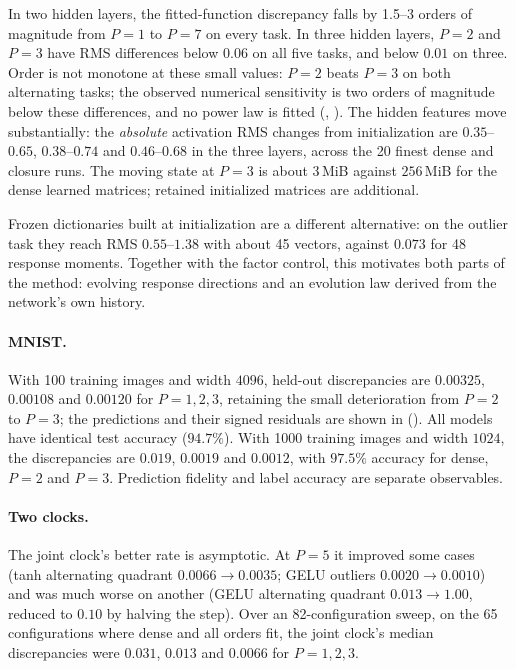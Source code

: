 \documentclass[11pt]{article}
\theoremstyle{definition}
\theoremstyle{remark}
\begin{document}
In two hidden layers, the fitted-function discrepancy falls by 1.5--3 orders
of magnitude from $P=1$ to $P=7$ on every task. In three hidden layers, $P=2$
and $P=3$ have RMS differences below $0.06$ on all five tasks, and below
$0.01$ on three. Order is not monotone at these small values: $P=2$ beats
$P=3$ on both alternating tasks; the observed numerical sensitivity is two
orders of magnitude below these differences, and no power law is fitted
(, ).  The hidden features move
substantially: the \emph{absolute} activation RMS
changes from initialization are $0.35$--$0.65$, $0.38$--$0.74$ and
$0.46$--$0.68$ in the three layers, across the 20 finest dense and closure runs.
The moving state at $P=3$ is about $3$\,MiB against $256$\,MiB for the dense
learned matrices; retained initialized matrices are additional.

Frozen dictionaries built at initialization are a different alternative:
on the outlier task they reach RMS $0.55$--$1.38$ with about 45 vectors,
against $0.073$ for 48 response moments. Together with the factor control,
this motivates both parts of the method: evolving response directions and
an evolution law derived from the network's own history.

\FloatBarrier
\paragraph{MNIST.}
With 100 training images and width $4096$, held-out discrepancies are
$0.00325$, $0.00108$ and $0.00120$ for $P=1,2,3$, retaining the small
deterioration from $P=2$ to $P=3$; the predictions and their signed residuals
are shown in  ().
All models have identical test accuracy ($94.7\%$). With 1000 training images
and width $1024$, the discrepancies are $0.019$, $0.0019$ and $0.0012$, with
$97.5\%$ accuracy for dense, $P=2$ and $P=3$. Prediction fidelity and label
accuracy are separate observables.

\FloatBarrier
\paragraph{Two clocks.}
The joint clock's better rate is asymptotic. At $P=5$ it improved some cases
(tanh alternating quadrant $0.0066\to0.0035$; GELU outliers $0.0020\to0.0010$)
and was much worse on another (GELU alternating quadrant $0.013\to1.00$, reduced
to $0.10$ by halving the step). Over an 82-configuration sweep, on the 65
configurations where dense and all orders fit, the joint clock's median
discrepancies were $0.031$, $0.013$ and $0.0066$ for $P=1,2,3$.
\end{document}
